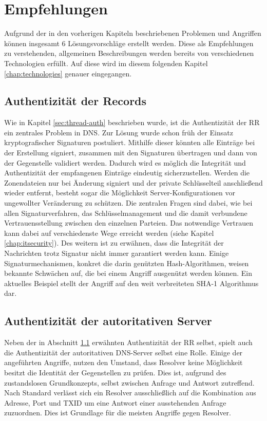\chapter{Empfehlungen}
\label{chap:solutions}
Aufgrund der in den vorherigen Kapiteln beschriebenen Problemen und Angriffen können insgesamt 6 Lösungsvorschläge erstellt werden. Diese als Empfehlungen zu verstehenden, allgemeinen Beschreibungen werden bereits von verschiedenen Technologien erfüllt. Auf diese wird im diesem folgenden Kapitel \ref{chap:technologies} genauer eingegangen.

\section{Authentizität der Records}
\label{sec:solution-recordauth}
Wie in Kapitel \ref{sec:thread-auth} beschrieben wurde, ist die Authentizität der RR ein zentrales Problem in DNS. Zur Lösung wurde schon früh der Einsatz kryptografischer Signaturen postuliert. Mithilfe dieser könnten alle Einträge bei der Erstellung signiert, zusammen mit den Signaturen übertragen und dann von der Gegenstelle validiert werden. Dadurch wird es möglich die Integrität und Authentizität der empfangenen Einträge eindeutig sicherzustellen. Werden die Zonendateien nur bei Änderung signiert und der private Schlüsselteil anschließend wieder entfernt, besteht sogar die Möglichkeit Server-Konfigurationen vor ungewollter Veränderung zu schützen. 
Die zentralen Fragen sind dabei, wie bei allen Signaturverfahren, das Schlüsselmanagement und die damit verbundene Vertrauensstellung zwischen den einzelnen Parteien. Das notwendige Vertrauen kann dabei auf verschiedenste Wege erreicht werden (siehe Kapitel \ref{chap:itsecurity}).
Des weitern ist zu erwähnen, dass die Integrität der Nachrichten trotz Signatur nicht immer garantiert werden kann. Einige Signaturmechanismen, konkret die darin genützten Hash-Algorithmen, weisen bekannte Schwächen auf, die bei einem Angriff ausgenützt werden können. Ein aktuelles Beispiel stellt der Angriff auf den weit verbreiteten SHA-1 Algorithmus dar\cite{Stevens2017}. 

\section{Authentizität der autoritativen Server}
Neben der in Abschnitt \ref{sec:solution-recordauth} erwähnten Authentizität der RR selbst, spielt auch die Authentizität der autoritativen DNS-Server selbst eine Rolle. Einige der angeführten Angriffe, nutzen den Umstand, dass Resolver keine Möglichkeit besitzt die Identität der Gegenstellen zu prüfen. Dies ist, aufgrund des zustandslosen Grundkonzepts, selbst zwischen Anfrage und Antwort zutreffend. Nach Standard verlässt sich ein Resolver ausschließlich auf die Kombination aus Adresse, Port und TXID um eine Antwort einer ausstehenden Anfrage zuzuordnen. Dies ist Grundlage für die meisten Angriffe gegen Resolver.

